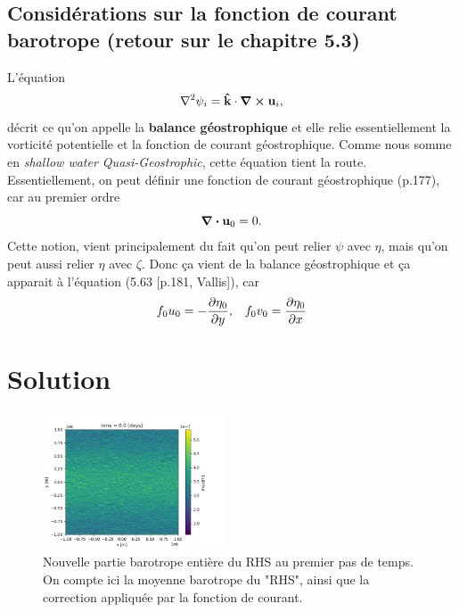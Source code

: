 \documentclass[10pt]{article}
\numberwithin{equation}{section}
\newcommand{\kvf}{\vb{\hat{k}}}
\newcommand{\uu}{\vb{u}}
\begin{document}
\subsection{Considérations sur la fonction de courant barotrope (retour sur le chapitre 5.3)}
\label{sec:orgb8ef8df}
L'équation
\begin{equation}
   \laplacian{\psi_i} = \kvf\cdot\curl{\uu_i},
\end{equation}
décrit ce qu'on appelle la \textbf{balance géostrophique} et elle relie essentiellement la vorticité potentielle et la fonction de courant géostrophique.
Comme nous somme en \emph{shallow water Quasi-Geostrophic}, cette équation tient la route.
Essentiellement, on peut définir une fonction de courant géostrophique (p.177), car au premier ordre
\begin{equation}
   \divergence{\uu_0} = 0.
\end{equation}
Cette notion, vient principalement du fait qu'on peut relier \(\psi\) avec \(\eta\), mais qu'on peut aussi relier \(\eta\) avec \(\zeta\).
Donc ça vient de la balance géostrophique et ça apparait à l'équation (5.63 [p.181, Vallis]), car
\begin{align}
&&f_0 u_0 = -\pdv{\eta_0}{y},
&& f_0 v_0 = \pdv{\eta_0}{x} &&
\end{align}



\section{Solution}
\label{sec:orgcb1844d}
\begin{figure} \vspace{-\baselineskip} \centering
\centering
\includegraphics[width=0.48\textwidth]{figures/debuggage/2023_06_14_RHSuBTmudpack.png}
\caption{\label{fig:org1336ad6}Nouvelle partie barotrope entière du RHS au premier pas de temps. On compte ici la moyenne barotrope du "RHS", ainsi que la correction appliquée par la fonction de courant.}
\end{figure}
\end{document}
